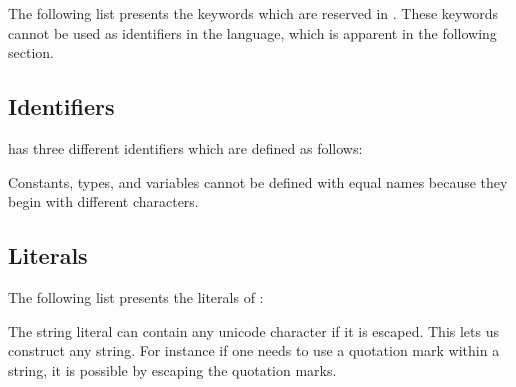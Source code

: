 The following list presents the keywords which are reserved in
\productname{}. These keywords cannot be used as identifiers in the language,
which is apparent in the following section.

\begin{ebnf}
\end{ebnf}

\subsection{Identifiers}

\productname{} has three different identifiers which are defined as follows:

\begin{ebnf}
\end{ebnf}

Constants, types, and variables cannot be defined with equal names because
they begin with different characters. 

\subsection{Literals}

The following list presents the literals of \productname{}:

\begin{ebnf}
\end{ebnf}

The string literal can contain any unicode character if it is escaped. This lets
us construct any string. For instance if one needs to use a quotation mark
within a string, it is possible by escaping the quotation marks.

\begin{ebnf}
\end{ebnf}



